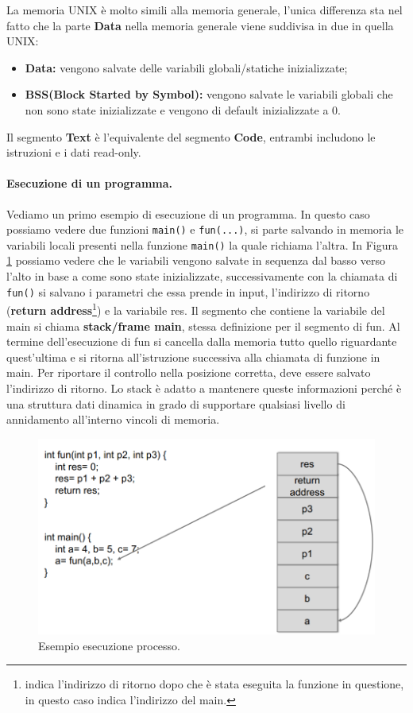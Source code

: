 La memoria UNIX è molto simili alla memoria generale, l'unica differenza sta nel fatto che la parte \textbf{Data} nella memoria generale viene suddivisa in due in quella UNIX:
\begin{itemize}
    \item \textbf{Data:} vengono salvate delle variabili globali/statiche inizializzate;
    \item \textbf{BSS(Block Started by Symbol):} vengono salvate le variabili globali che non sono state inizializzate e vengono di default inizializzate a 0.
\end{itemize}
Il segmento \textbf{Text} è l'equivalente del segmento \textbf{Code}, entrambi includono le istruzioni e i dati read-only.

\paragraph{Esecuzione di un programma.}
Vediamo un primo esempio di esecuzione di un programma. In questo caso possiamo vedere due funzioni \verb|main()| e \verb|fun(...)|, si parte salvando in memoria le variabili locali presenti nella funzione \verb|main()| la quale richiama l'altra. In Figura \ref{fig:es_esec_processo} possiamo vedere che le variabili vengono salvate in sequenza dal basso verso l'alto in base a come sono state inizializzate, successivamente con la chiamata di \verb|fun()| si salvano i parametri che essa prende in input, l'indirizzo di ritorno (\textbf{return address}\footnote{indica l'indirizzo di ritorno dopo che è stata eseguita la funzione in questione, in questo caso indica l'indirizzo del main.}) e la variabile res. Il segmento che contiene la variabile del main si chiama \textbf{stack/frame main}, stessa definizione per il segmento di fun. Al termine dell'esecuzione di fun si cancella dalla memoria tutto quello riguardante quest'ultima e si ritorna all'istruzione successiva alla chiamata di funzione in main. Per riportare il controllo nella posizione corretta, deve essere salvato l'indirizzo di ritorno. Lo stack è adatto a mantenere queste informazioni perché è una struttura dati dinamica in grado di supportare qualsiasi livello di annidamento all'interno vincoli di memoria.
\begin{figure}[H]
	\centering
    \includegraphics[width=13cm, keepaspectratio]{santini/img/cap_2/es_esecuzione_processo.png}
	\caption{Esempio esecuzione processo.}\label{fig:es_esec_processo}
\end{figure}

